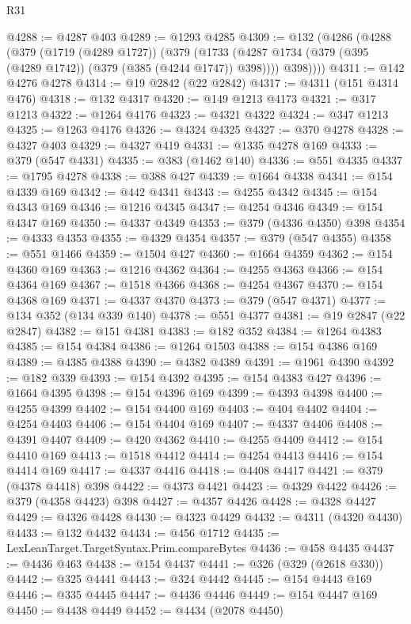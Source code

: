 \begin{lexlean}{R31}
\begin{coremodule}
@4288 := @4287 @403
@4289 := @1293 @4285
@4309 := @132
    (@4286
      (@4288
        (@379
          (@1719 (@4289 @1727))
          (@379
            (@1733 (@4287 @1734 (@379 (@395 (@4289 @1742)) (@379 (@385 (@4244 @1747)) @398))))
            @398))))
@4311 := @142 @4276 @4278
@4314 := @19 @2842 (@22 @2842)
@4317 := @4311 (@151 @4314 @476)
@4318 := @132 @4317
@4320 := @149 @1213 @4173
@4321 := @317 @1213
@4322 := @1264 @4176
@4323 := @4321 @4322
@4324 := @347 @1213
@4325 := @1263 @4176
@4326 := @4324 @4325
@4327 := @370 @4278
@4328 := @4327 @403
@4329 := @4327 @419
@4331 := @1335 @4278 @169
@4333 := @379 (@547 @4331)
@4335 := @383 (@1462 @140)
@4336 := @551 @4335
@4337 := @1795 @4278
@4338 := @388 @427
@4339 := @1664 @4338
@4341 := @154 @4339 @169
@4342 := @442 @4341
@4343 := @4255 @4342
@4345 := @154 @4343 @169
@4346 := @1216 @4345
@4347 := @4254 @4346
@4349 := @154 @4347 @169
@4350 := @4337 @4349
@4353 := @379 (@4336 @4350) @398
@4354 := @4333 @4353
@4355 := @4329 @4354
@4357 := @379 (@547 @4355)
@4358 := @551 @1466
@4359 := @1504 @427
@4360 := @1664 @4359
@4362 := @154 @4360 @169
@4363 := @1216 @4362
@4364 := @4255 @4363
@4366 := @154 @4364 @169
@4367 := @1518 @4366
@4368 := @4254 @4367
@4370 := @154 @4368 @169
@4371 := @4337 @4370
@4373 := @379 (@547 @4371)
@4377 := @134 @352 (@134 @339 @140)
@4378 := @551 @4377
@4381 := @19 @2847 (@22 @2847)
@4382 := @151 @4381
@4383 := @182 @352
@4384 := @1264 @4383
@4385 := @154 @4384
@4386 := @1264 @1503
@4388 := @154 @4386 @169
@4389 := @4385 @4388
@4390 := @4382 @4389
@4391 := @1961 @4390
@4392 := @182 @339
@4393 := @154 @4392
@4395 := @154 @4383 @427
@4396 := @1664 @4395
@4398 := @154 @4396 @169
@4399 := @4393 @4398
@4400 := @4255 @4399
@4402 := @154 @4400 @169
@4403 := @404 @4402
@4404 := @4254 @4403
@4406 := @154 @4404 @169
@4407 := @4337 @4406
@4408 := @4391 @4407
@4409 := @420 @4362
@4410 := @4255 @4409
@4412 := @154 @4410 @169
@4413 := @1518 @4412
@4414 := @4254 @4413
@4416 := @154 @4414 @169
@4417 := @4337 @4416
@4418 := @4408 @4417
@4421 := @379 (@4378 @4418) @398
@4422 := @4373 @4421
@4423 := @4329 @4422
@4426 := @379 (@4358 @4423) @398
@4427 := @4357 @4426
@4428 := @4328 @4427
@4429 := @4326 @4428
@4430 := @4323 @4429
@4432 := @4311 (@4320 @4430)
@4433 := @132 @4432
@4434 := @456 @1712
@4435 := LexLeanTarget.TargetSyntax.Prim.compareBytes
@4436 := @458 @4435
@4437 := @4436 @463
@4438 := @154 @4437
@4441 := @326 (@329 (@2618 @330))
@4442 := @325 @4441
@4443 := @324 @4442
@4445 := @154 @4443 @169
@4446 := @335 @4445
@4447 := @4436 @4446
@4449 := @154 @4447 @169
@4450 := @4438 @4449
@4452 := @4434 (@2078 @4450)

\end{coremodule}
\end{lexlean}
